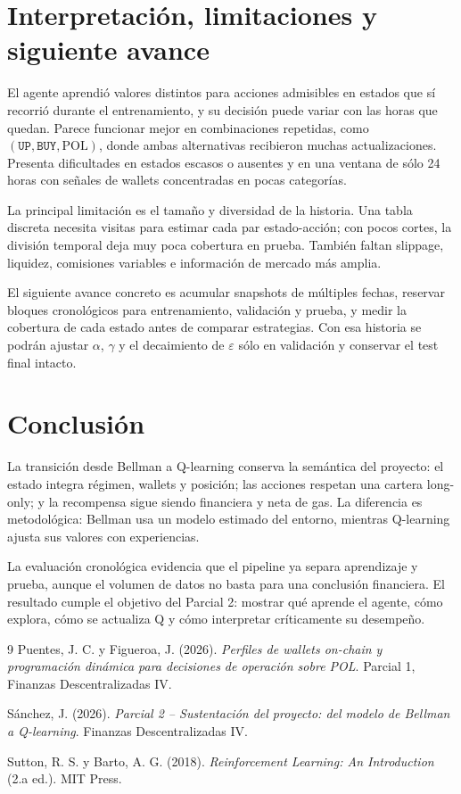 \documentclass[12pt,letterpaper]{article}
\newcommand{\code}[1]{\texttt{#1}}
\begin{document}
\section{Interpretación, limitaciones y siguiente avance}

El agente aprendió valores distintos para acciones admisibles en estados que sí
recorrió durante el entrenamiento, y su decisión puede variar con las horas que
quedan. Parece funcionar mejor en combinaciones repetidas, como
$(\code{UP},\code{BUY},\text{POL})$, donde ambas alternativas recibieron muchas
actualizaciones. Presenta dificultades en estados escasos o ausentes y en una
ventana de sólo 24 horas con señales de wallets concentradas en pocas categorías.

La principal limitación es el tamaño y diversidad de la historia. Una tabla
discreta necesita visitas para estimar cada par estado-acción; con pocos cortes,
la división temporal deja muy poca cobertura en prueba. También faltan slippage,
liquidez, comisiones variables e información de mercado más amplia.

El siguiente avance concreto es acumular snapshots de múltiples fechas,
reservar bloques cronológicos para entrenamiento, validación y prueba, y medir
la cobertura de cada estado antes de comparar estrategias. Con esa historia se
podrán ajustar $\alpha$, $\gamma$ y el decaimiento de $\varepsilon$ sólo en
validación y conservar el test final intacto.

\section{Conclusión}

La transición desde Bellman a Q-learning conserva la semántica del proyecto:
el estado integra régimen, wallets y posición; las acciones respetan una cartera
long-only; y la recompensa sigue siendo financiera y neta de gas. La diferencia
es metodológica: Bellman usa un modelo estimado del entorno, mientras Q-learning
ajusta sus valores con experiencias.

La evaluación cronológica evidencia que el pipeline ya separa aprendizaje y
prueba, aunque el volumen de datos no basta para una conclusión financiera. El
resultado cumple el objetivo del Parcial 2: mostrar qué aprende el agente, cómo
explora, cómo se actualiza Q y cómo interpretar críticamente su desempeño.

\begin{thebibliography}{9}
Puentes, J. C. y Figueroa, J. (2026). \emph{Perfiles de wallets on-chain y programación dinámica para decisiones de operación sobre POL}. Parcial 1, Finanzas Descentralizadas IV.

Sánchez, J. (2026). \emph{Parcial 2 -- Sustentación del proyecto: del modelo de Bellman a Q-learning}. Finanzas Descentralizadas IV.

Sutton, R. S. y Barto, A. G. (2018). \emph{Reinforcement Learning: An Introduction} (2.a ed.). MIT Press.
\end{thebibliography}
\end{document}
